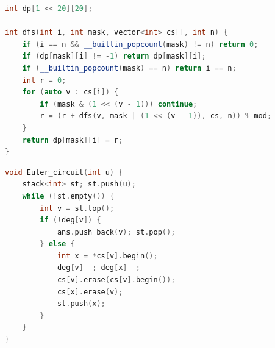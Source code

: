 \begin{lstlisting}[language=C++]
int dp[1 << 20][20];

int dfs(int i, int mask, vector<int> cs[], int n) {
    if (i == n && __builtin_popcount(mask) != n) return 0;
    if (dp[mask][i] != -1) return dp[mask][i];
    if (__builtin_popcount(mask) == n) return i == n;
    int r = 0;
    for (auto v : cs[i]) {
        if (mask & (1 << (v - 1))) continue;
        r = (r + dfs(v, mask | (1 << (v - 1)), cs, n)) % mod;
    }
    return dp[mask][i] = r;
}
\end{lstlisting}

\begin{lstlisting}[language=C++]
void Euler_circuit(int u) {
    stack<int> st; st.push(u);
    while (!st.empty()) {
        int v = st.top();
        if (!deg[v]) {
            ans.push_back(v); st.pop();
        } else {
            int x = *cs[v].begin();
            deg[v]--; deg[x]--;
            cs[v].erase(cs[v].begin());
            cs[x].erase(v);
            st.push(x);
        }
    }
}
\end{lstlisting}
